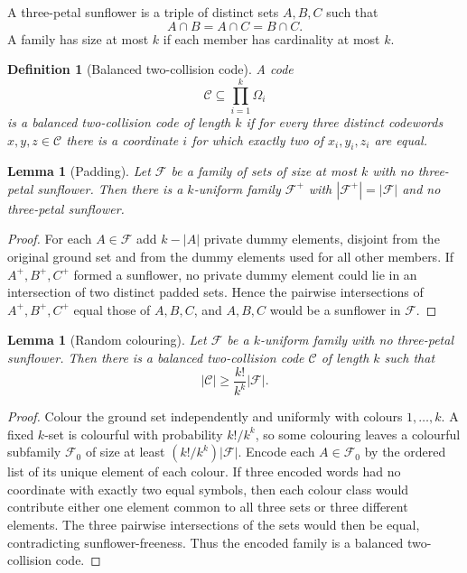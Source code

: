 \documentclass[11pt]{article}
\newtheorem{lemma}[theorem]{Lemma}
\newtheorem{definition}[theorem]{Definition}
\theoremstyle{remark}
\newcommand{\C}{\mathcal C}
\newcommand{\F}{\mathcal F}
\begin{document}
A three-petal sunflower is a triple of distinct sets $A,B,C$ such that
\[
        A\cap B=A\cap C=B\cap C.
\]
A family has size at most $k$ if each member has cardinality at most $k$.

\begin{definition}[Balanced two-collision code]
A code
\[
        \C\subseteq \prod_{i=1}^{k}\Omega_i
\]
is a balanced two-collision code of length $k$ if for every three distinct codewords $x,y,z\in\C$ there is a coordinate $i$ for which exactly two of $x_i,y_i,z_i$ are equal.
\end{definition}

\begin{lemma}[Padding]
Let $\F$ be a family of sets of size at most $k$ with no three-petal sunflower.  Then there is a $k$-uniform family $\F^+$ with $|\F^+|=|\F|$ and no three-petal sunflower.
\end{lemma}

\begin{proof}
For each $A\in\F$ add $k-|A|$ private dummy elements, disjoint from the original ground set and from the dummy elements used for all other members.  If $A^+,B^+,C^+$ formed a sunflower, no private dummy element could lie in an intersection of two distinct padded sets.  Hence the pairwise intersections of $A^+,B^+,C^+$ equal those of $A,B,C$, and $A,B,C$ would be a sunflower in $\F$.
\end{proof}

\begin{lemma}[Random colouring]
Let $\F$ be a $k$-uniform family with no three-petal sunflower.  Then there is a balanced two-collision code $\C$ of length $k$ such that
\[
        |\C|\ge \frac{k!}{k^k}|\F|.
\]
\end{lemma}

\begin{proof}
Colour the ground set independently and uniformly with colours $1,\ldots,k$.  A fixed $k$-set is colourful with probability $k!/k^k$, so some colouring leaves a colourful subfamily $\F_0$ of size at least $(k!/k^k)|\F|$.  Encode each $A\in\F_0$ by the ordered list of its unique element of each colour.  If three encoded words had no coordinate with exactly two equal symbols, then each colour class would contribute either one element common to all three sets or three different elements.  The three pairwise intersections of the sets would then be equal, contradicting sunflower-freeness.  Thus the encoded family is a balanced two-collision code.
\end{proof}
\end{document}
